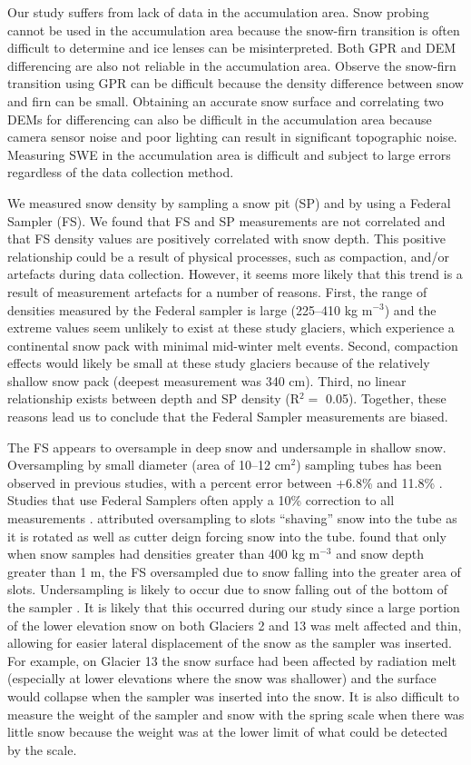 \documentclass[twocolumn,letterpaper]{igs}
\begin{document}
Our study suffers from lack of data in the accumulation area. Snow probing cannot be used in the accumulation area because the snow-firn transition is often difficult to determine and ice lenses can be misinterpreted. Both GPR and DEM differencing are also not reliable in the accumulation area. Observe the snow-firn transition using GPR can be difficult because the density difference between snow and firn can be small. Obtaining an accurate snow surface and correlating two DEMs for differencing can also be difficult in the accumulation area because camera sensor noise and poor lighting can result in significant topographic noise. Measuring SWE in the accumulation area is difficult and subject to large errors regardless of the data collection method.

We measured snow density by sampling a snow pit (SP) and by using a Federal Sampler (FS). We found that FS and SP measurements are not correlated and that FS density values are positively correlated with snow depth. This positive relationship could be a result of physical processes, such as compaction, and/or artefacts during data collection. However, it seems more likely that this trend is a result of measurement artefacts for a number of reasons. First, the range of densities measured by the Federal sampler is large (225--410 kg m$^{-3}$) and the extreme values seem unlikely to exist at these study glaciers, which experience a continental snow pack with minimal mid-winter melt events. Second, compaction effects would likely be small at these study glaciers because of the relatively shallow snow pack (deepest measurement was 340 cm). Third, no linear relationship exists between depth and SP density (R$^2=$ 0.05). Together, these reasons lead us to conclude that the Federal Sampler measurements are biased. 

The FS appears to oversample in deep snow and undersample in shallow snow. Oversampling by small diameter (area of 10--12 cm$^2$) sampling tubes has been observed in previous studies, with a percent error between +6.8\% and 11.8\% \citep{Work1965, Fames1982, Conger2009}. Studies that use Federal Samplers often apply a 10\% correction to all measurements \citep[e.g.][]{Molotch2005}. \cite{Dixon2012} attributed oversampling to slots ``shaving'' snow into the tube as it is rotated as well as cutter deign forcing snow into the tube. \cite{Beaumont1963} found that only when snow samples had densities greater than 400 kg m$^{-3}$ and snow depth greater than 1 m, the FS oversampled due to snow falling into the greater area of slots. Undersampling is likely to occur due to snow falling out of the bottom of the sampler \citep{Turcan1975}. It is likely that this occurred during our study since a large portion of the lower elevation snow on both Glaciers 2 and 13 was melt affected and thin, allowing for easier lateral displacement of the snow as the sampler was inserted. For example, on Glacier 13 the snow surface had been affected by radiation melt (especially at lower elevations where the snow was shallower) and the surface would collapse when the sampler was inserted into the snow. It is also difficult to measure the weight of the sampler and snow with the spring scale when there was little snow because the weight was at the lower limit of what could be detected by the scale.
\end{document}
